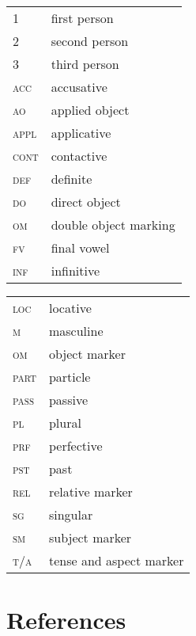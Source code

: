 \documentclass[output=paper]{langsci/langscibook}
\begin{document}
\begin{tabularx}{.45\textwidth}{>{\scshape}lX}
1 & first person \\
2 & second person \\
3 & third person \\
acc & accusative \\
ao & applied object \\
appl & applicative \\
cont & contactive \\
def & definite \\
do & direct object \\
om & double object marking \\
fv & final vowel \\
inf & infinitive \\
\end{tabularx}
\begin{tabularx}{.45\textwidth}{>{\scshape}lX}
loc & locative \\
m & masculine \\
om & object marker \\
part & particle \\
pass & passive \\
pl & plural \\
prf & perfective \\
pst & past \\
rel & relative marker \\
sg & singular \\
sm & subject marker \\
t/a  &  tense and aspect marker \\
\end{tabularx}

\section {References}
\end{document}
